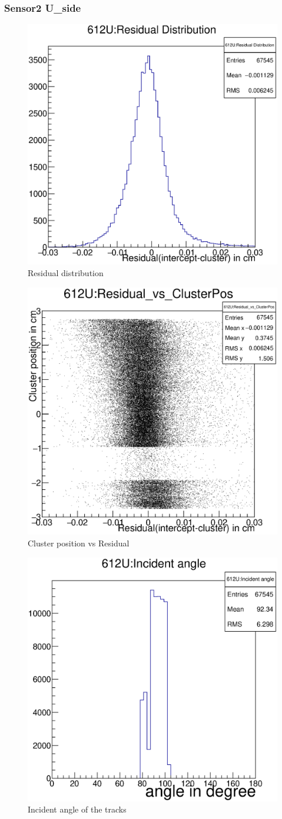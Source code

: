 \documentclass[12pt]{article}
\begin{document}
	\subsubsection{Sensor2 U\_side}
	\begin{multicols}{3}
		
		\begin{figure}[H]
			\includegraphics[width=.3\textwidth]{612U:residualplot.eps}	
			\caption{Residual distribution}	
			\label{fig1}	
		\end{figure}
		\begin{figure}[H]
			\includegraphics[width=.3\textwidth]{612U:residual_vs_clusterpos.eps}	
			\caption{Cluster position vs Residual}	
			\label{fig2}	
		\end{figure}
		\begin{figure}[H]
			\includegraphics[width=.3\textwidth]{612U:incident_angle.eps}	
			\caption{Incident angle of the tracks}	
			\label{fig2}	
		\end{figure}
	\end{multicols}
	
\end{document}
